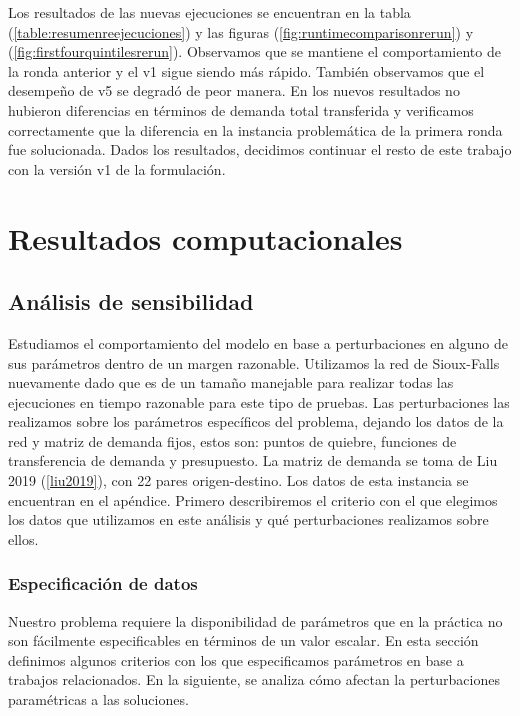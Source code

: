 \documentclass{article}
\begin{document}
  Los resultados de las nuevas ejecuciones se encuentran en la tabla (\ref{table:resumenreejecuciones}) y las figuras (\ref{fig:runtimecomparisonrerun}) y (\ref{fig:firstfourquintilesrerun}). Observamos que se mantiene el comportamiento de la ronda anterior y el v1 sigue siendo más rápido. También observamos que el desempeño de v5 se degradó de peor manera. En los nuevos resultados no hubieron diferencias en términos de demanda total transferida y verificamos correctamente que la diferencia en la instancia problemática de la primera ronda fue solucionada. Dados los resultados, decidimos continuar el resto de este trabajo con la versión v1 de la formulación.

  \section{Resultados computacionales}

  \subsection{Análisis de sensibilidad}

  Estudiamos el comportamiento del modelo en base a perturbaciones en alguno de sus parámetros dentro de un margen razonable. Utilizamos la red de Sioux-Falls nuevamente dado que es de un tamaño manejable para realizar todas las ejecuciones en tiempo razonable para este tipo de pruebas. Las perturbaciones las realizamos sobre los parámetros específicos del problema, dejando los datos de la red y matriz de demanda fijos, estos son: puntos de quiebre, funciones de transferencia de demanda y presupuesto. La matriz de demanda se toma de Liu 2019 (\ref{liu2019}), con 22 pares origen-destino. Los datos de esta instancia se encuentran en el apéndice. Primero describiremos el criterio con el que elegimos los datos que utilizamos en este análisis y qué perturbaciones realizamos sobre ellos.

  \subsubsection{Especificación de datos}

  Nuestro problema requiere la disponibilidad de parámetros que en la práctica no son fácilmente especificables en términos de un valor escalar. En esta sección definimos algunos criterios con los que especificamos parámetros en base a trabajos relacionados. En la siguiente, se analiza cómo afectan la perturbaciones paramétricas a las soluciones.
\end{document}
